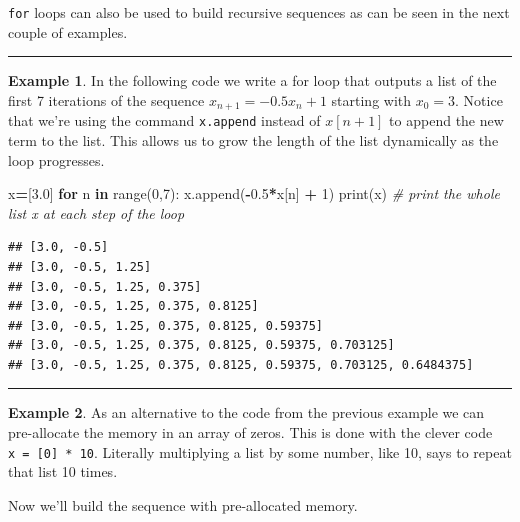 \documentclass[
]{book}
\newenvironment{Shaded}{\begin{snugshade}}{\end{snugshade}}
\newcommand{\BuiltInTok}[1]{#1}
\newcommand{\CommentTok}[1]{\textcolor[rgb]{0.56,0.35,0.01}{\textit{#1}}}
\newcommand{\ControlFlowTok}[1]{\textcolor[rgb]{0.13,0.29,0.53}{\textbf{#1}}}
\newcommand{\DecValTok}[1]{\textcolor[rgb]{0.00,0.00,0.81}{#1}}
\newcommand{\FloatTok}[1]{\textcolor[rgb]{0.00,0.00,0.81}{#1}}
\newcommand{\KeywordTok}[1]{\textcolor[rgb]{0.13,0.29,0.53}{\textbf{#1}}}
\newcommand{\NormalTok}[1]{#1}
\newcommand{\OperatorTok}[1]{\textcolor[rgb]{0.81,0.36,0.00}{\textbf{#1}}}
\theoremstyle{definition}
\theoremstyle{definition}
\newtheorem{example}{Example}[chapter]
\theoremstyle{definition}
\theoremstyle{remark}
\begin{document}
\texttt{for} loops can also be used to build recursive sequences as can be seen in the next couple of examples.

\begin{center}\rule{0.5\linewidth}{0.5pt}\end{center}

\begin{example}
\protect\hypertarget{exm:unnamed-chunk-661}{}{\label{exm:unnamed-chunk-661} }In the following code we write a for loop that outputs a list of the first 7 iterations of the sequence \(x_{n+1}=-0.5x_n+1\) starting with \(x_0=3\). Notice that we're using the command \texttt{x.append} instead of \(x[n+1]\) to append the new term to the list. This allows us to grow the length of the list dynamically as the loop progresses.
\end{example}

\begin{Shaded}
\begin{Highlighting}[]
\NormalTok{x}\OperatorTok{=}\NormalTok{[}\FloatTok{3.0}\NormalTok{]}
\ControlFlowTok{for}\NormalTok{ n }\KeywordTok{in} \BuiltInTok{range}\NormalTok{(}\DecValTok{0}\NormalTok{,}\DecValTok{7}\NormalTok{):}
\NormalTok{    x.append(}\OperatorTok{{-}}\FloatTok{0.5}\OperatorTok{*}\NormalTok{x[n] }\OperatorTok{+} \DecValTok{1}\NormalTok{)}
    \BuiltInTok{print}\NormalTok{(x) }\CommentTok{\# print the whole list x at each step of the loop}
\end{Highlighting}
\end{Shaded}

\begin{verbatim}
## [3.0, -0.5]
## [3.0, -0.5, 1.25]
## [3.0, -0.5, 1.25, 0.375]
## [3.0, -0.5, 1.25, 0.375, 0.8125]
## [3.0, -0.5, 1.25, 0.375, 0.8125, 0.59375]
## [3.0, -0.5, 1.25, 0.375, 0.8125, 0.59375, 0.703125]
## [3.0, -0.5, 1.25, 0.375, 0.8125, 0.59375, 0.703125, 0.6484375]
\end{verbatim}

\begin{center}\rule{0.5\linewidth}{0.5pt}\end{center}

\begin{example}
\protect\hypertarget{exm:unnamed-chunk-663}{}{\label{exm:unnamed-chunk-663} }As an alternative to the code from the previous example we can pre-allocate the memory in an array of zeros. This is done with the clever code \texttt{x\ =\ {[}0{]}\ *\ 10}. Literally multiplying a list by some number, like 10, says to repeat that list 10 times.

Now we'll build the sequence with pre-allocated memory.
\end{example}
\end{document}

